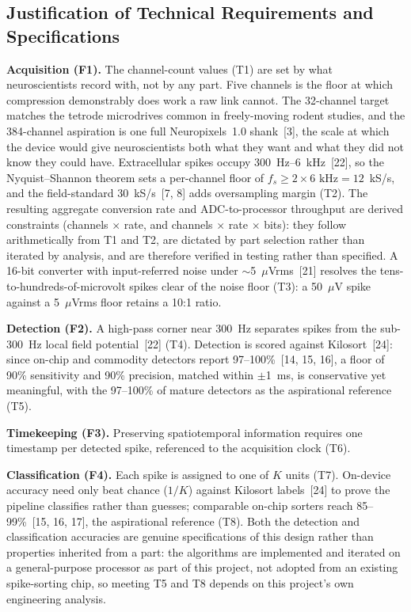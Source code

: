 \documentclass[11pt]{article}
\begin{document}
\subsection{Justification of Technical Requirements and Specifications}
\textbf{Acquisition (F1).} The channel-count values (T1) are set by what neuroscientists
record with, not by any part. Five channels is the floor at which compression demonstrably
does work a raw link cannot. The 32-channel target matches the tetrode microdrives common
in freely-moving rodent studies, and the 384-channel aspiration is one full
Neuropixels~1.0 shank~[3], the scale at which the device would give neuroscientists both
what they want and what they did not know they could have. Extracellular spikes occupy
300~Hz--6~kHz~[22], so the Nyquist--Shannon theorem sets a per-channel floor of
$f_s \geq 2 \times 6\text{~kHz} = 12$~kS/s, and the field-standard
30~kS/s~[7, 8] adds oversampling margin (T2). The resulting aggregate conversion rate and
ADC-to-processor throughput are derived constraints (channels $\times$ rate, and channels
$\times$ rate $\times$ bits): they follow arithmetically from T1 and T2, are dictated by
part selection rather than iterated by analysis, and are therefore verified in testing
rather than specified. A 16-bit converter with input-referred noise under
$\sim$5~$\mu$Vrms~[21] resolves the tens-to-hundreds-of-microvolt spikes clear of the
noise floor (T3): a 50~$\mu$V spike against a 5~$\mu$Vrms floor retains a 10:1 ratio.

\textbf{Detection (F2).} A high-pass corner near 300~Hz separates spikes from the sub-300~Hz
local field potential~[22] (T4). Detection is scored against Kilosort~[24]: since on-chip and
commodity detectors report 97--100\%~[14, 15, 16], a floor of 90\% sensitivity and 90\%
precision, matched within $\pm$1~ms, is conservative yet meaningful, with the
97--100\% of mature detectors as the aspirational reference (T5).

\textbf{Timekeeping (F3).} Preserving spatiotemporal information requires one timestamp per
detected spike, referenced to the acquisition clock (T6).

\textbf{Classification (F4).} Each spike is assigned to one of $K$ units (T7). On-device
accuracy need only beat chance ($1/K$) against Kilosort labels~[24] to prove the pipeline
classifies rather than guesses; comparable on-chip sorters reach 85--99\%~[15, 16, 17], the
aspirational reference (T8). Both the detection and classification accuracies are genuine
specifications of this design rather than properties inherited from a part: the algorithms
are implemented and iterated on a general-purpose processor as part of this project, not
adopted from an existing spike-sorting chip, so meeting T5 and T8 depends on this
project's own engineering analysis.
\end{document}
